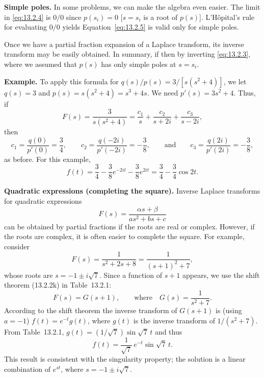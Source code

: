 \textbf{Simple poles.}
In some problems, we can make the algebra even easier.  The limit in \eqref{eq:13.2.4} is $0/0$ since $p(s_i) = 0$ [$s = s_i$ is a root of $p(s)$].  L'H\^opital's rule for evaluating $0/0$ yields
Equation~\eqref{eq:13.2.5} is valid only for simple poles.

Once we have a partial fraction expansion of a Laplace transform, its inverse transform may be easily obtained.  In summary, if
then by inverting \eqref{eq:13.2.3},
where we assumed that $p(s)$ has only simple poles at $s = s_i$.

\textbf{Example.}
To apply this formula for $q(s)/p(s) = 3/[s(s^2+4)]$, we let $q(s) = 3$ and $p(s) = s(s^2+4) = s^3 + 4s$.  We need $p'(s) = 3s^2+4$.  Thus, if
\[
F(s) = \frac{3}{s(s^2+4)} = \frac{c_1}{s} + \frac{c_2}{s+2i} + \frac{c_3}{s-2i},
\]
then
\[
c_1 = \frac{q(0)}{p'(0)} = \frac{3}{4}, \qquad
c_2 = \frac{q(-2i)}{p'(-2i)} = -\frac{3}{8}, \qquad\text{and}\qquad
c_3 = \frac{q(2i)}{p'(2i)} = -\frac{3}{8},
\]
as before.  For this example,
\[
f(t) = \frac{3}{4} - \frac{3}{8}e^{-2it} - \frac{3}{8}e^{2it}
     = \frac{3}{4} - \frac{3}{4}\cos 2t.
\]

\textbf{Quadratic expressions (completing the square).}
Inverse Laplace transforms for quadratic expressions
\[
F(s) = \frac{\alpha s + \beta}{as^2 + bs + c}
\]
can be obtained by partial fractions if the roots are real or complex.  However, if the roots are complex, it is often easier to complete the square.  For example, consider
\[
F(s) = \frac{1}{s^2+2s+8} = \frac{1}{(s+1)^2+7},
\]
whose roots are $s = -1 \pm i\sqrt{7}$.  Since a function of $s+1$ appears, we use the shift theorem (13.2.2k) in Table~13.2.1:
\[
F(s) = G(s+1), \qquad \text{where}\quad G(s) = \frac{1}{s^2+7}.
\]
According to the shift theorem the inverse transform of $G(s+1)$ is (using $a=-1$)
$f(t) = e^{-t}g(t)$, where $g(t)$ is the inverse transform of $1/(s^2+7)$.  From Table~13.2.1, $g(t) = (1/\sqrt{7})\sin\sqrt{7}\,t$ and thus
\[
f(t) = \frac{1}{\sqrt{7}}\,e^{-t}\sin\sqrt{7}\,t.
\]
This result is consistent with the singularity property; the solution is a linear combination of $e^{st}$, where $s = -1 \pm i\sqrt{7}$.

